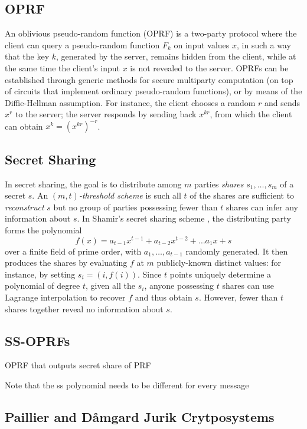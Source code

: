\subsection{OPRF}

An oblivious pseudo-random function (OPRF) \cite{OPRF,Pinkas} is
a two-party protocol where the client can query a pseudo-random function
$F_{k}$ on input values $x$, in such a way that the key $k$, generated
by the server, remains hidden from the client, while at the same time
the client's input $x$ is not revealed to the server. OPRFs can be
established through generic methods for secure multiparty computation
(on top of circuits that implement ordinary pseudo-random functions),
or by means of the Diffie-Hellman assumption. For instance, the client
chooses a random $r$ and sends $x^{r}$ to the server; the server
responds by sending back $x^{kr}$, from which the client can obtain
$x^{k}=(x^{kr})^{-r}$.

\subsection{Secret Sharing}

In secret sharing, the goal is to distribute among $m$ parties \emph{shares
}$s_{1},\ldots,s_{m}$ of a secret $s$. An \emph{$(m,t)$-threshold
scheme} is such all $t$ of the shares are sufficient to \emph{reconstruct
}$s$ but no group of parties possessing fewer than $t$ shares can
infer any information about $s$. In Shamir's secret sharing scheme
\cite{Shamir}, the distributing party forms the polynomial 
\[
f(x)=a_{t-1}x^{t-1}+a_{t-2}x^{t-2}+\ldots a_{1}x+s
\]
over a finite field of prime order, with $a_{1},\ldots,a_{t-1}$ randomly
generated. It then produces the shares by evaluating $f$ at $m$
publicly-known distinct values: for instance, by setting $s_{i}=(i,f(i))$.
Since $t$ points uniquely determine a polynomial of degree $t$,
given all the $s_{i}$, anyone possessing $t$ shares can use Lagrange
interpolation to recover $f$ and thus obtain $s$. However, fewer
than $t$ shares together reveal no information about $s$.

\subsection{SS-OPRFs}

OPRF that outputs secret share of PRF

Note that the ss polynomial needs to be different for every message

\subsection{Paillier and D\aa mgard Jurik Crytposystems}

